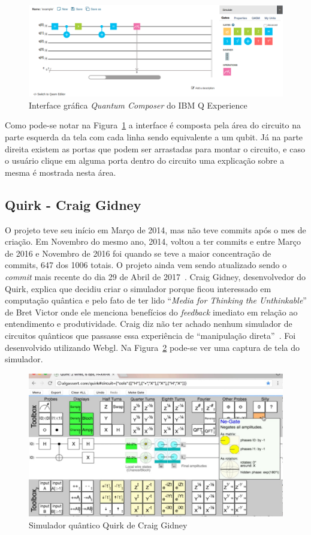 \documentclass[a4paper, 12pt, oneside]{book}
\begin{document}
\begin{figure}[H]
\centering
\includegraphics[scale=0.36]{ibmq.png}
\caption{Interface gráfica \textit{Quantum Composer} do IBM Q Experience}
\label{fig:ibmq}
\end{figure}

Como pode-se notar na Figura~\ref{fig:ibmq} a interface é composta pela área do circuito na parte esquerda da tela com cada linha sendo equivalente a um qubit. Já na parte direita existem as portas que podem ser arrastadas para montar o circuito, e caso o usuário clique em alguma porta dentro do circuito uma explicação sobre a mesma é mostrada nesta área.

\subsection{Quirk - Craig Gidney}

O projeto teve seu início em Março de 2014, mas não teve commits após o mes de criação. Em Novembro do mesmo ano, 2014, voltou a ter commits e entre Março de 2016 e Novembro de 2016 foi quando se teve a maior concentração de commits, 647 dos 1006 totais. O projeto ainda vem sendo atualizado sendo o \textit{commit} mais recente do dia 29 de Abril de 2017~\cite{gitquirk}. Craig Gidney, desenvolvedor do Quirk, explica que decidiu criar o simulador porque ficou interessado em computação quântica e pelo fato de ter lido ``\textit{Media for Thinking the Unthinkable}'' de Bret Victor onde ele menciona benefícios do \textit{feedback} imediato em relação ao entendimento e produtividade. Craig diz não ter achado nenhum simulador de circuitos quânticos que passasse essa experiência de ``manipulação direta''~\cite{quirk}. Foi desenvolvido utilizando Webgl. Na Figura~\ref{fig:quirk} pode-se ver uma captura de tela do simulador.

\begin{figure}[hbtp]
\centering
\includegraphics[scale=0.36]{quirk.jpg}
\caption{Simulador quântico Quirk de Craig Gidney}
\label{fig:quirk}
\end{figure}
\end{document}
